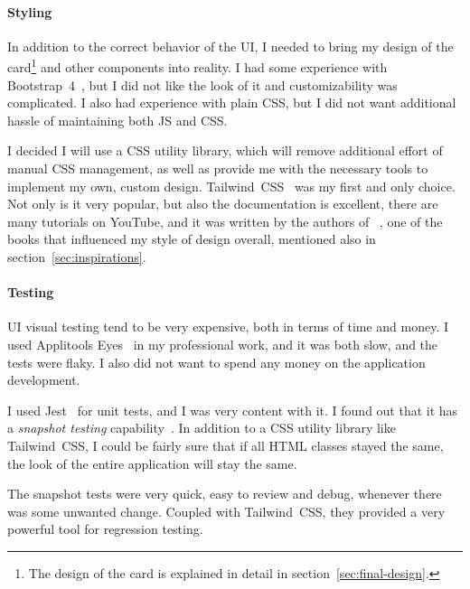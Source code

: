 \paragraph*{Styling}\label{sec:ui-styling}

In addition to the correct behavior of the \ac{UI},
I needed to bring my design of the card\footnote{
  The design of the card
  is explained in detail
  in section~\ref{sec:final-design}.
} and other components
into reality.
I had some experience with Bootstrap~4~\cite{otto_bootstrap_2018},
but I did not like the look of it
and customizability was complicated.
I also had experience with plain \ac{CSS},
but I did not want additional hassle
of maintaining both \ac{JS} and \ac{CSS}.

I decided I will use a \ac{CSS} utility library,
which will remove additional effort
of manual \ac{CSS} management,
as well as provide me with the necessary tools
to implement my own, custom design.
Tailwind~CSS~\cite{wathan_tailwind_2022}
was my first and only choice.
Not only is it very popular,
but also the documentation is excellent,
there are many tutorials on YouTube,
and it was written by the authors
of ~\cite{wathan_refactoring_2018},
one of the books that influenced
my style of design overall,
mentioned also in section~\ref{sec:inspirations}.

\paragraph*{Testing}\label{sec:ui-testing}

\Ac{UI} visual testing tend to be very expensive,
both in terms of time and money.
I used Applitools Eyes~\cite{applitools_applitools_2022}
in my professional work,
and it was both slow,
and the tests were flaky.
I also did not want to spend any money
on the application development.

I used Jest~\cite{bekkhus_jest_2022} for unit tests,
and I was very content with it.
I found out that it has
a \textit{snapshot testing} capability~\cite{bekkhus_snapshot_2022}.
In addition to a \ac{CSS} utility library
like Tailwind~CSS,
I could be fairly sure
that if all \ac{HTML} classes stayed the same,
the look of the entire application
will stay the same.

The snapshot tests were very quick,
easy to review and debug,
whenever there was some unwanted change.
Coupled with Tailwind~CSS,
they provided a very powerful tool
for regression testing.

